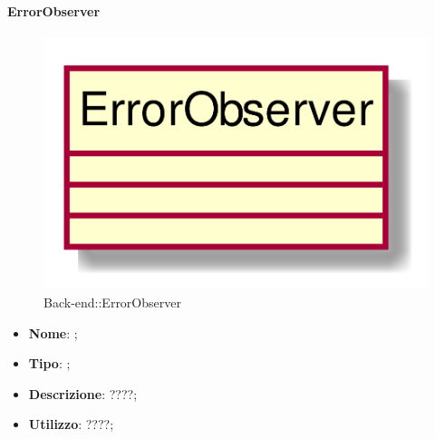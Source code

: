 \hypertarget{ErrorObserver_label}{\paragraph{ErrorObserver}}
\begin{figure}[h]
	\centering
	\includegraphics[width=\textwidth,height=\textheight,keepaspectratio]{images/ClassErrorObserver.png}
	\caption{Back-end::ErrorObserver}
\end{figure}
\begin{itemize}
	\item \textbf{Nome}: ;
	\item \textbf{Tipo}: ;
	\item \textbf{Descrizione}: ????;
	\item \textbf{Utilizzo}: ????;
\end{itemize}
\FloatBarrier

